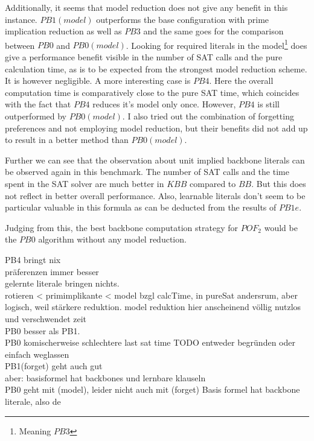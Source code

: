 Additionally, it seems that model reduction does not give any benefit in this instance. $PB1(model)$ outperforms the base configuration with prime implication reduction as well as $PB3$ and the same goes for the comparison between $PB0$ and $PB0(model)$. Looking for required literals in the model\footnote{Meaning $PB3$} does give a performance benefit visible in the number of SAT calls and the pure calculation time, as is to be expected from the strongest model reduction scheme. It is however negligible. A more interesting case is $PB4$. Here the overall computation time is comparatively close to the pure SAT time, which coincides with the fact that $PB4$ reduces it's model only once. However, $PB4$ is still outperformed by $PB0(model)$. I also tried out the combination of forgetting preferences and not employing model reduction, but their benefits did not add up to result in a better method than $PB0(model)$.

Further we can see that the observation about unit implied backbone literals can be observed again in this benchmark. The number of SAT calls and the time spent in the SAT solver are much better in $KBB$ compared to $BB$. But this does not reflect in better overall performance. Also, learnable literals don't seem to be particular valuable in this formula as can be deducted from the results of $PB1e$.

Judging from this, the best backbone computation strategy for $POF_2$ would be the $PB0$ algorithm without any model reduction.



PB4 bringt nix\\
präferenzen immer besser\\
gelernte literale bringen nichts.\\
rotieren < primimplikante < model bzgl calcTime, in pureSat andersrum, aber logisch, weil stärkere reduktion. model reduktion hier anscheinend völlig nutzlos und verschwendet zeit\\
PB0 besser als PB1. \\
PB0 komischerweise schlechtere last sat time TODO entweder begründen oder einfach weglassen\\
PB1(forget) geht auch gut\\
aber: basisformel hat backbones und lernbare klauseln\\

PB0 geht mit (model), leider nicht auch mit (forget)
Basis formel hat backbone literale, also de




